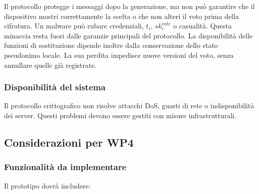 \documentclass[12pt,a4paper]{article}
\newcommand{\sk}{\mathit{sk}}
\begin{document}
Il protocollo protegge i messaggi dopo la generazione, ma non pu\`o garantire che il dispositivo mostri correttamente la scelta o che non alteri il voto prima della cifratura. Un malware pu\`o rubare credenziali, $t_i$, $\sk_i^{\mathit{vote}}$ o casualit\`a. Questa minaccia resta fuori dalle garanzie principali del protocollo. La disponibilità delle funzioni di sostituzione dipende inoltre dalla conservazione dello stato pseudonimo locale. La sua perdita impedisce nuove versioni del voto, senza annullare quelle già registrate.

\subsubsection*{Disponibilit\`a del sistema}

Il protocollo crittografico non risolve attacchi DoS, guasti di rete o indisponibilit\`a dei server. Questi problemi devono essere gestiti con misure infrastrutturali.

\subsection{Considerazioni per WP4}

\subsubsection*{Funzionalit\`a da implementare}

Il prototipo dovr\`a includere:
\end{document}
